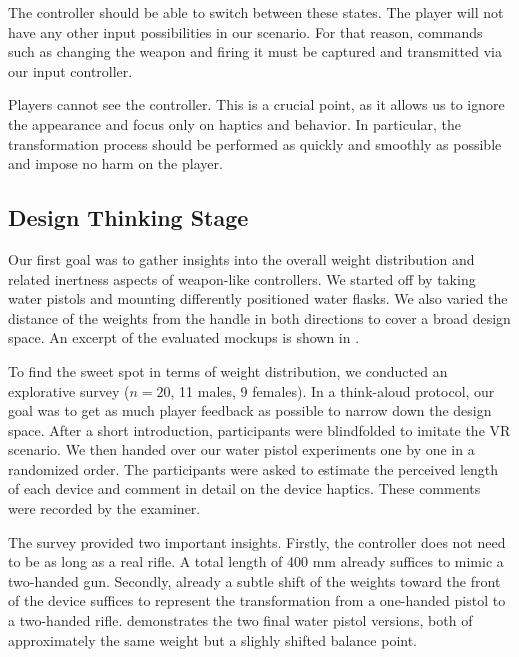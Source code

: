 \documentclass{sigchi}
\begin{document}
The controller should be able to switch between these states. The player will not have any other input possibilities in our scenario. For that reason, commands such as changing the weapon and firing it must be captured and transmitted via our input controller. 

Players cannot see the controller. This is a crucial point, as it allows us to ignore the appearance and focus only on haptics and behavior. In particular, the transformation process should be performed as quickly and smoothly as possible and impose no harm on the player.


\subsection{Design Thinking Stage}


Our first goal was to gather insights into the overall weight distribution and related inertness aspects of weapon-like controllers. We started off by taking water pistols and mounting differently positioned water flasks. We also varied the distance of the weights from the handle in both directions to cover a broad design space. An excerpt of the evaluated mockups is shown in .

To find the sweet spot in terms of weight distribution, we conducted an explorative survey ($n=20$, 11 males, 9 females). In a think-aloud protocol, our goal was to get as much player feedback as possible to narrow down the design space. After a short introduction, participants were blindfolded to imitate the VR scenario. We then handed over our water pistol experiments one by one in a randomized order. The participants were asked to estimate the perceived length of each device and comment in detail on the device haptics. These comments were recorded by the examiner.

The survey provided two important insights. Firstly, the controller does not need to be as long as a real rifle. A total length of 400 mm already suffices to mimic a two-handed gun. Secondly, already a subtle shift of the weights toward the front of the device suffices to represent the transformation from a one-handed pistol to a two-handed rifle.  demonstrates the two final water pistol versions, both of approximately the same weight but a slighly shifted balance point.
\end{document}
